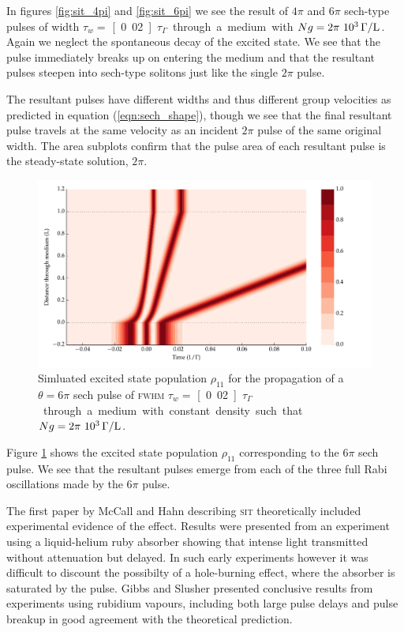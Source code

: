     In figures \ref{fig:sit_4pi} and \ref{fig:sit_6pi} we see the result of
    $4\pi$ and $6\pi$ sech-type pulses of width $\tau_w =$
    \unit[0.02]{$\tau_\Gamma$} through a medium with $Ng =
    \unit[2\pi~10^3]{\Gamma/L}$. Again we neglect the spontaneous decay of the
    excited state. We see that the pulse immediately breaks up on entering the
    medium and that the resultant pulses steepen into sech-type solitons just
    like the single $2\pi$ pulse.    

    The resultant pulses have different widths and thus different group
    velocities as predicted in equation (\ref{eqn:sech_shape}), though we see
    that the final resultant pulse travels at the same velocity as an incident
    $2\pi$ pulse of the same original width. The area subplots confirm that the pulse area of each resultant pulse is the steady-state solution, $2\pi$.

    \begin{figure}[]
      \includegraphics[width=\linewidth]
        {figs/03_nonlinear/coh_sech_6_0pi_fwhm0_020_Ng01000_fig3.pdf}
      \caption{
        Simluated excited state population $\rho_{11}$ for the propagation of a
        $\theta = 6\pi$ sech pulse of \textsc{fwhm} $\tau_w = $
        \unit[0.02]{$\tau_\Gamma$} through a medium with constant density such
        that $Ng = \unit[2\pi~10^3]{\Gamma/L}$.
      }
      \label{fig:sit_6pi_pop}
    \end{figure}

    Figure \ref{fig:sit_6pi_pop} shows the excited state population $\rho_{11}$
    corresponding to the $6\pi$ sech pulse. We see that the resultant pulses
    emerge from each of the three full Rabi oscillations made by the $6\pi$
    pulse.

    The first paper by McCall and Hahn describing \textsc{sit} theoretically
    included experimental evidence of the effect.\cite{McCall1969} Results were
    presented from an experiment using a liquid-helium ruby absorber showing
    that intense light transmitted without attenuation but delayed. In such
    early experiments however it was difficult to discount the possibilty of a
    hole-burning effect, where the absorber is saturated by the pulse. Gibbs and
    Slusher presented conclusive results from experiments using rubidium
    vapours,\cite{Slusher1972} including both large pulse delays and pulse
    breakup in good agreement with the theoretical prediction.
